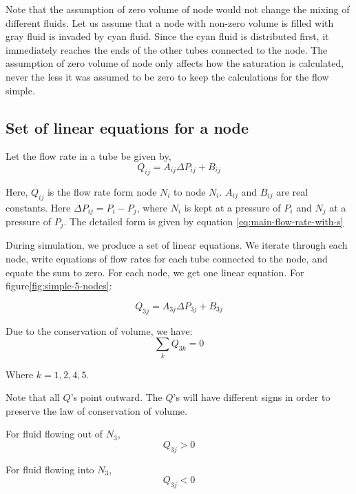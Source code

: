 	Note that the assumption of zero volume of node would not change the mixing of different fluids. Let us assume that a node with non-zero volume is filled with gray fluid is invaded by cyan fluid. Since the cyan fluid is distributed first, it immediately reaches the ends of the other tubes connected to the node. The assumption of zero volume of node only affects how the saturation is calculated, never the less it was assumed to be zero to keep the calculations for the flow simple.

\subsection{Set of linear equations for a node} \label{sec:linear-equ}
	
	Let the flow rate in a tube be given by,
	\begin{equation}  \label{eq:flow-rate-simple-coeff}
		Q_{ij} = A_{ij}\Delta P_{ij} + B_{ij}
	\end{equation}
	
	Here, $Q_{ij}$ is the flow rate form node $N_i$ to node $N_i$. $A_{ij}$ and $B_{ij}$ are real constants. Here $\Delta P_{ij} = P_i - P_j$, where $N_i$ is kept at a pressure of $P_i$ and $N_j$ at a pressure of $P_j$. The detailed form is given by equation \ref{eq:main-flow-rate-with-s}
	
	During simulation, we produce a set of linear equations. We iterate through each node, write equations of flow rates for each tube connected to the node, and equate the sum to zero. For each node, we get one linear equation. For figure\ref{fig:simple-5-nodes}:
	
	\begin{equation}
		Q_{3j} = A_{3j}\Delta P_{3j} + B_{3j}
	\end{equation}

	Due to the conservation of volume, we have:
	\begin{equation}
		\sum_{k} Q_{3k} = 0
	\end{equation}
	
	Where $k = {1, 2, 4, 5}$.
	
	Note that all $Q$'s point outward. The $Q$'s will have different signs in order to preserve the law of conservation of volume. 
	
	For fluid flowing out of $N_3$,
	\begin{equation}
		Q_{3j} > 0
	\end{equation}
	
	For fluid flowing into $N_3$,
	\begin{equation}
		Q_{3j} < 0
	\end{equation}
	
